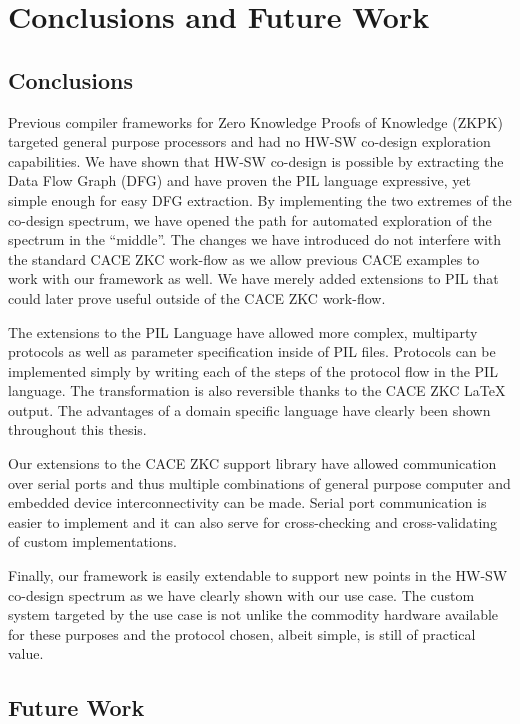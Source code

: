 \chapter{Conclusions and Future Work}

\section{Conclusions}

Previous compiler frameworks for Zero Knowledge Proofs of Knowledge
(ZKPK) targeted general purpose processors and had no HW-SW co-design
exploration capabilities. We have shown that HW-SW co-design is
possible by extracting the Data Flow Graph (DFG) and have proven the
PIL language expressive, yet simple enough for easy DFG extraction. By
implementing the two extremes of the co-design spectrum, we have
opened the path for automated exploration of the spectrum in the
``middle''. The changes we have introduced do not interfere with the
standard CACE ZKC work-flow as we allow previous CACE examples to work
with our framework as well. We have merely added extensions to PIL
that could later prove useful outside of the CACE ZKC work-flow.

The extensions to the PIL Language have allowed more complex,
multiparty protocols as well as parameter specification inside of PIL
files. Protocols can be implemented simply by writing each of the
steps of the protocol flow in the PIL language. The transformation is
also reversible thanks to the CACE ZKC \LaTeX{} output. The advantages
of a domain specific language have clearly been shown throughout this
thesis.

Our extensions to the CACE ZKC support library have allowed
communication over serial ports and thus multiple combinations of
general purpose computer and embedded device interconnectivity can be
made. Serial port communication is easier to implement and it can also
serve for cross-checking and cross-validating of custom
implementations.

Finally, our framework is easily extendable to support new points in
the HW-SW co-design spectrum as we have clearly shown with our use
case. The custom system targeted by the use case is not unlike the
commodity hardware available for these purposes and the protocol
chosen, albeit simple, is still of practical value.

\section{Future Work}

